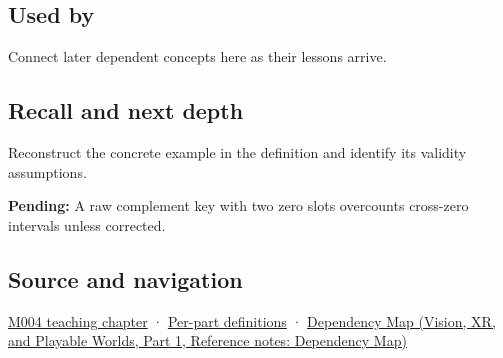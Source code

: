 \subsection{Used by}\label{appendix-deca299ae4b8-used-by}

\hypertarget{appendix-deca299ae4b8-used-by}{}

Connect later dependent concepts here as their lessons arrive.

\subsection{Recall and next depth}\label{appendix-deca299ae4b8-recall-and-next-depth}

\hypertarget{appendix-deca299ae4b8-recall-and-next-depth}{}

Reconstruct the concrete example in the definition and identify its validity assumptions.

\textbf{Pending:} A raw complement key with two zero slots overcounts cross-zero intervals unless corrected.

\subsection{Source and navigation}\label{appendix-deca299ae4b8-source-and-navigation}

\hypertarget{appendix-deca299ae4b8-source-and-navigation}{}

\hyperref[01-foundations-i-ch001-a-stretching-ruler-for-real-valued-quantities]{M004 teaching chapter} · \hyperref[appendix-fd090d982a15-m004---parts-61-76]{Per-part definitions} · \href{../07-Vision-XR-and-Playable-Worlds-P01/main.pdf\#appendix-4ad47bdd269a}{Dependency Map (Vision, XR, and Playable Worlds, Part 1, Reference notes: Dependency Map)}
